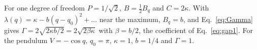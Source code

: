 For one degree of freedom $P = 1/\sqrt2$, $B = \tfrac12 B_q$ and $C = 2\kappa$. With $\lambda(q) = \kappa - b(q-q_0)^2 + \dots$ near the maximum, $B_q = b$, and Eq.~\eqref{eq:Gamma} gives $\Gamma = 2\sqrt{2\kappa b/2} = 2\sqrt{2\beta\kappa}$ with $\beta = b/2$, the coefficient of Eq.~\eqref{eq:gap1}. For the pendulum $V = -\cos q$, $q_0 = \pi$, $\kappa = 1$, $b = 1/4$ and $\Gamma = 1$.
